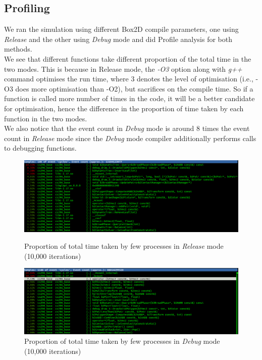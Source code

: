 \documentclass[10pt]{article} \usepackage[a4paper,left=0.8in,right=0.8in,top=0.4in,bottom=0.8in]{geometry} \usepackage{graphicx}
\begin{document}
\subsection{Profiling}
We ran the simulation using different Box2D compile parameters, one using \textit{Release} and the other using \textit{Debug} mode and did Profile analysis for both methods.\\
We see that different functions take different proportion of the total time in the two modes. This is because in Release mode, the \textit{-O3} option along with \textit{g++} command optimises the run time, where 3 denotes the level of optimisation (i.e., -O3 does more optimisation than -O2), but sacrifices on the compile time. So if a function is called more number of times in the code, it will be a better candidate for optimisation, hence the difference in the proportion of time taken by each function in the two modes.\\
We also notice that the event count in \textit{Debug} mode is around 8 times the event count in \textit{Release} mode since the \textit{Debug} mode compiler additionally performs calls to debugging functions.

\begin{figure}[ht!] 
\centering 
\includegraphics[width=1\textwidth]{images/release_mode.png} 
\caption{Proportion of total time taken by few processes in \textit{Release} mode (10,000 iterations)}
\includegraphics[width=1\textwidth]{images/debug_mode.png} 
\caption{Proportion of total time taken by few processes in \textit{Debug} mode (10,000 iterations)}
\end{figure}
\end{document}
